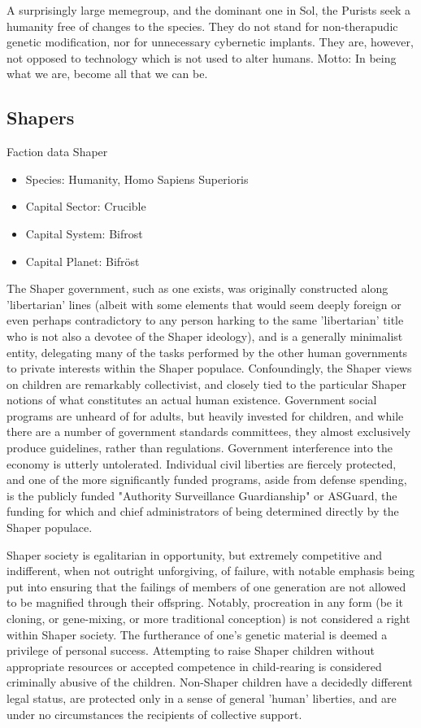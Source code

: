A surprisingly large memegroup, and the dominant one in Sol, the
Purists seek a humanity free of changes to the species. They do not
stand for non-therapudic genetic modification, nor for unnecessary
cybernetic implants. They are, however, not opposed to technology
which is not used to alter humans. Motto: In being what we are, become
all that we can be.



\subsection{Shapers}

Faction data Shaper
\begin{itemize}
\item Species: Humanity, Homo Sapiens Superioris
\item Capital Sector: Crucible
\item Capital System: Bifrost
\item Capital Planet: Bifröst
\end{itemize}

The Shaper government, such as one exists, was originally constructed
along 'libertarian' lines (albeit with some elements that would seem
deeply foreign or even perhaps contradictory to any person harking to
the same 'libertarian' title who is not also a devotee of the Shaper
ideology), and is a generally minimalist entity, delegating many of
the tasks performed by the other human governments to private
interests within the Shaper populace. Confoundingly, the Shaper views
on children are remarkably collectivist, and closely tied to the
particular Shaper notions of what constitutes an actual human
existence. Government social programs are unheard of for adults, but
heavily invested for children, and while there are a number of
government standards committees, they almost exclusively produce
guidelines, rather than regulations. Government interference into the
economy is utterly untolerated. Individual civil liberties are
fiercely protected, and one of the more significantly funded programs,
aside from defense spending, is the publicly funded "Authority
Surveillance Guardianship" or ASGuard, the funding for which and chief
administrators of being determined directly by the Shaper populace.

Shaper society is egalitarian in opportunity, but extremely
competitive and indifferent, when not outright unforgiving, of
failure, with notable emphasis being put into ensuring that the
failings of members of one generation are not allowed to be magnified
through their offspring. Notably, procreation in any form (be it
cloning, or gene-mixing, or more traditional conception) is not
considered a right within Shaper society. The furtherance of one's
genetic material is deemed a privilege of personal success. Attempting
to raise Shaper children without appropriate resources or accepted
competence in child-rearing is considered criminally abusive of the
children. Non-Shaper children have a decidedly different legal status,
are protected only in a sense of general 'human' liberties, and are
under no circumstances the recipients of collective support.

